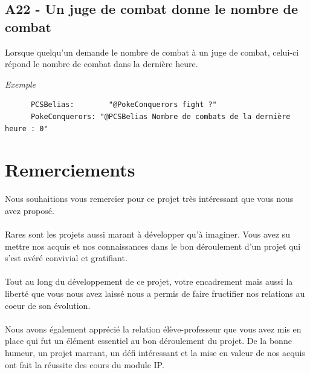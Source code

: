 \documentclass[12pt]{article}
\begin{document}
{{\subsection{A22 - Un juge de combat donne le nombre de combat}

Lorsque quelqu'un demande le nombre de combat à un juge de combat, celui-ci répond le nombre de combat dans la dernière heure.\\

{\noindent \textit{Exemple}
\begin{verbatim}
      PCSBelias: 	    "@PokeConquerors fight ?"
      PokeConquerors: "@PCSBelias Nombre de combats de la dernière heure : 0"
\end{verbatim}

\newpage
\section{Remerciements}

Nous souhaitions vous remercier pour ce projet très intéressant que vous nous avez proposé. \\
\\
Rares sont les projets aussi marant à développer qu'à imaginer. Vous avez su mettre nos acquis et nos connaissances dans le bon déroulement d'un projet qui s'est avéré convivial et gratifiant.\\
\\
Tout au long du développement de ce projet, votre encadrement mais aussi la liberté que vous nous avez laissé nous a permis de faire fructifier nos relations au coeur de son évolution.\\
\\
Nous avons également apprécié la relation élève-professeur que vous avez mis en place qui fut un élément essentiel au bon déroulement du projet. De la bonne humeur, un projet marrant, un défi intéressant et la mise en valeur de nos acquis ont fait la réussite des cours du module IP.

\newpage
}}}
\end{document}
